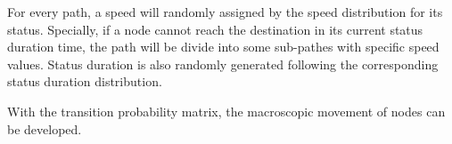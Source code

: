 For every path, a speed will randomly assigned by the speed distribution for its status. Specially, if a node cannot reach the destination in its current status duration time, the path will be divide into some sub-pathes with specific speed values. Status duration is also randomly generated following the corresponding status duration distribution.

With the transition probability matrix, the macroscopic movement of nodes can be developed. 